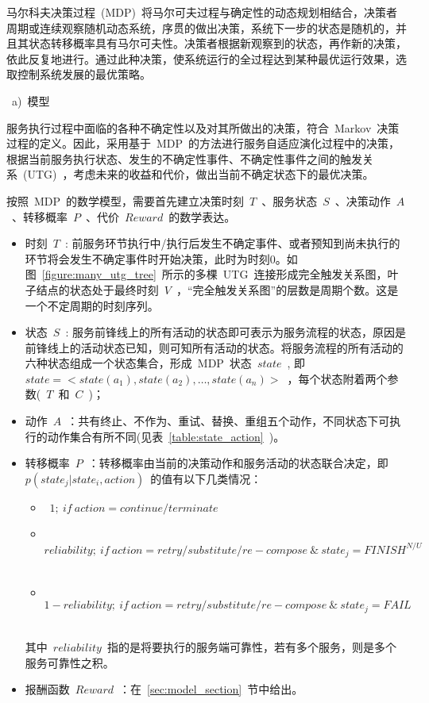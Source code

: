 马尔科夫决策过程~(MDP)~将马尔可夫过程与确定性的动态规划相结合，决策者周期或连续观察随机动态系统，序贯的做出决策，系统下一步的状态是随机的，并且其状态转移概率具有马尔可夫性。决策者根据新观察到的状态，再作新的决策，依此反复地进行。通过此种决策，使系统运行的全过程达到某种最优运行效果，选取控制系统发展的最优策略。

~a)~{模型}

服务执行过程中面临的各种不确定性以及对其所做出的决策，符合~Markov~决策过程的定义。因此，采用基于~MDP~的方法进行服务自适应演化过程中的决策，根据当前服务执行状态、发生的不确定性事件、不确定性事件之间的触发关系~(UTG)~，考虑未来的收益和代价，做出当前不确定状态下的最优决策。

按照~MDP~的数学模型，需要首先建立决策时刻~$T$~、服务状态~$S$~、决策动作~$A$~、转移概率~$P$~、代价~$Reward$~的数学表达。
\begin{itemize}

\item 时刻~$T$~: 前服务环节执行中/执行后发生不确定事件、或者预知到尚未执行的环节将会发生不确定事件时开始决策，此时为时刻0。如图~\ref{figure:many_utg_tree}~所示的多棵~UTG~连接形成完全触发关系图，叶子结点的状态处于最终时刻~$V$~，“完全触发关系图”的层数是周期个数。这是一个不定周期的时刻序列。

\item 状态~$S$~: 服务前锋线上的所有活动的状态即可表示为服务流程的状态，原因是前锋线上的活动状态已知，则可知所有活动的状态。将服务流程的所有活动的六种状态组成一个状态集合，形成~MDP~状态~$state$~, 即~$state =  < state({a_1}),state({a_2}), \ldots ,state({a_n}) >$~，每个状态附着两个参数(~$T$~和~$C$~)；

\item 动作~$A$~：共有终止、不作为、重试、替换、重组五个动作，不同状态下可执行的动作集合有所不同(见表~\ref{table:state_action}~)。

\item 转移概率~$P$~：转移概率由当前的决策动作和服务活动的状态联合决定，即~$p(state_j|state_i,action)$~的值有以下几类情况：
\begin{itemize}
    \item ~$1;~if~action = continue/terminate$~
    \item ~$reliability;~if~action = retry/substitute/re-compose~ \& ~ state_j = FINIS{H^{N/U}}$~
    \item ~$1 - reliability;~if~action = retry/substitute/re-compose ~\& ~ state_j = FAIL$~
\end{itemize}
其中~$reliability$~指的是将要执行的服务端可靠性，若有多个服务，则是多个服务可靠性之积。

\item 报酬函数~$Reward$~：在~\ref{sec:model_section}~节中给出。

\end{itemize}

